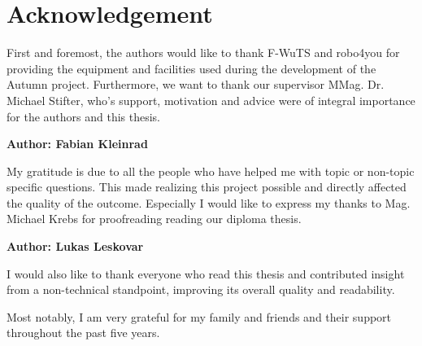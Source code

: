 \chapter{Acknowledgement}

First and foremost, the authors would like to thank F-WuTS and robo4you for providing the equipment and facilities used during the development of the Autumn project. Furthermore, we want to thank our supervisor MMag. Dr. Michael Stifter, who's support, motivation and advice were of integral importance for the authors and this thesis.\linebreak

\textbf{Author: Fabian Kleinrad}

My gratitude is due to all the people who have helped me with topic or non-topic specific questions. This made realizing this project possible and directly affected the quality of the outcome. 
Especially I would like to express my thanks to Mag. Michael Krebs for proofreading reading our diploma thesis.

\textbf{Author: Lukas Leskovar}


I would also like to thank everyone who read this thesis and contributed insight from a non-technical standpoint, improving its overall quality and readability. 

Most notably, I am very grateful for my family and friends and their support throughout the past five years. 
